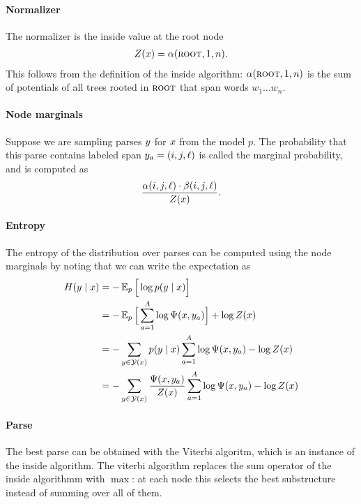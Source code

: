 \paragraph{Normalizer}
The normalizer is the inside value at the root node
\begin{align*}
  Z(x) = \alpha(\textsc{root}, 1, n).
\end{align*}
This follows from the definition of the inside algorithm: $\alpha(\textsc{root}, 1, n)$ is the sum of potentials of all trees rooted in $\textsc{root}$ that span words $w_1 \dots w_n$.

\paragraph{Node marginals}
Suppose we are sampling parses $y$ for $x$ from the model $p$. The probability that this parse contains labeled span $y_a = (i, j, \ell)$ is called the marginal probability, and is computed as
\begin{align*}
  \frac{\alpha(i, j, \ell) \cdot \beta(i, j, \ell)}{Z(x)}.
\end{align*}

\paragraph{Entropy}
The entropy of the distribution over parses can be computed using the node marginals by noting that we can write the expectation as
\begin{align*}
  H(y \mid x)
    &= - \operatorname{\mathbb{E}}_{p} \Big[ \log p(y \mid x) \Big]  \\
    &= - \operatorname{\mathbb{E}}_{p} \Big[ \sum_{a=1}^A \log \Psi(x, y_a) \Big] + \log Z(x)  \\
    &= - \sum_{ y \in \mathcal{Y}(x) } p(y \mid x) \sum_{a=1}^A \log \Psi(x, y_a) - \log Z(x)  \\
    &= - \sum_{ y \in \mathcal{Y}(x) } \frac{ \Psi(x, y_a) }{ Z(x) } \sum_{a=1}^A \log \Psi(x, y_a) - \log Z(x)  \\
\end{align*}

\paragraph{Parse}
The best parse can be obtained with the Viterbi algoritm, which is an instance of the inside algorithm. The viterbi algorithm replaces the sum operator of the inside algorithmm with $\max$: at each node this selects the best substructure instead of summing over all of them.

